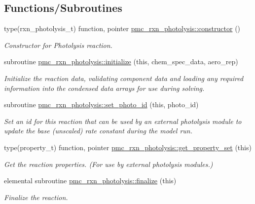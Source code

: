 \subsection*{Functions/\+Subroutines}
\begin{DoxyCompactItemize}
\item 
type(rxn\+\_\+photolysis\+\_\+t) function, pointer \mbox{\hyperlink{namespacepmc__rxn__photolysis_a707869a2e17f3c990a319ea4f499f817}{pmc\+\_\+rxn\+\_\+photolysis\+::constructor}} ()
\begin{DoxyCompactList}\small\item\em Constructor for Photolysis reaction. \end{DoxyCompactList}\item 
subroutine \mbox{\hyperlink{namespacepmc__rxn__photolysis_a5bb1a44b92cddb65c916ce21407f100f}{pmc\+\_\+rxn\+\_\+photolysis\+::initialize}} (this, chem\+\_\+spec\+\_\+data, aero\+\_\+rep)
\begin{DoxyCompactList}\small\item\em Initialize the reaction data, validating component data and loading any required information into the condensed data arrays for use during solving. \end{DoxyCompactList}\item 
subroutine \mbox{\hyperlink{namespacepmc__rxn__photolysis_a1f8dd20a2cecce0ac7743554aa07391e}{pmc\+\_\+rxn\+\_\+photolysis\+::set\+\_\+photo\+\_\+id}} (this, photo\+\_\+id)
\begin{DoxyCompactList}\small\item\em Set an id for this reaction that can be used by an external photolysis module to update the base (unscaled) rate constant during the model run. \end{DoxyCompactList}\item 
type(property\+\_\+t) function, pointer \mbox{\hyperlink{namespacepmc__rxn__photolysis_a924562930599077fc2c7ec9d2c470e84}{pmc\+\_\+rxn\+\_\+photolysis\+::get\+\_\+property\+\_\+set}} (this)
\begin{DoxyCompactList}\small\item\em Get the reaction properties. (For use by external photolysis modules.) \end{DoxyCompactList}\item 
elemental subroutine \mbox{\hyperlink{namespacepmc__rxn__photolysis_a187bdf76b3c0f39f73d8cbab0a813ac9}{pmc\+\_\+rxn\+\_\+photolysis\+::finalize}} (this)
\begin{DoxyCompactList}\small\item\em Finalize the reaction. \end{DoxyCompactList}\item 

\end{DoxyCompactItemize}
